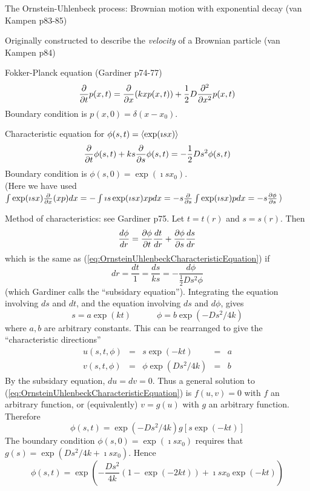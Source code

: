 \documentclass{beamer}
\begin{document}
\begin{frame}{}

The Ornstein-Uhlenbeck process: Brownian motion with exponential decay (van Kampen p83-85)
 \itemb
 \item Originally constructed to describe the {\em velocity} of a Brownian particle (van Kampen p84)
 \item Fokker-Planck equation (Gardiner p74-77)
\[
\frac{\partial}{\partial {t}} p(x,t) = \frac{\partial}{\partial {x}} (kxp(x,t)) + \frac{1}{2} D \frac{\partial^{2}}{\partial {x}^{2}} p(x,t)
\]
Boundary condition is $p(x,0) = \delta(x-x_0)$.
 \item Characteristic equation for $\phi(s,t) = \langle \exp(\imath sx) \rangle$
\begin{equation}
\label{eq:OrnsteinUhlenbeckCharacteristicEquation}
\frac{\partial}{\partial {t}} \phi(s,t) + ks\frac{\partial}{\partial {s}} \phi(s,t) = -\frac{1}{2} Ds^2 \phi(s,t)
\end{equation}
Boundary condition is $\phi(s,0) = \exp(\imath sx_0)$.
\\
(Here we have used $\int \exp(\imath sx) \frac{\partial}{\partial {x}} (xp) dx = -\int \imath s \exp(\imath sx) xp dx = -s \frac{\partial}{\partial {s}} \int \exp(\imath sx) pdx = -s \frac{\partial {\phi}}{\partial {s}}$)
  \itemb
  \item Method of characteristics: see Gardiner p75.
Let $t=t(r)$ and $s=s(r)$. Then
\[
\frac{d {\phi}}{d {r}} = \frac{\partial {\phi}}{\partial {t}} \frac{d {t}}{d {r}} + \frac{\partial {\phi}}{\partial {s}} \frac{d {s}}{d {r}}
\]
which is the same as (\ref{eq:OrnsteinUhlenbeckCharacteristicEquation}) if
\[
dr = \frac{dt}{1} = \frac{ds}{ks} = -\frac{d\phi}{\frac{1}{2} Ds^2 \phi}
\]
(which Gardiner calls the ``subsidary equation'').
Integrating the equation involving $ds$ and $dt$, and the equation involving $ds$ and $d\phi$, gives
\[
s = a \exp(kt)
\quad\quad\quad
\phi = b \exp(-Ds^2/4k)
\]
where $a,b$ are arbitrary constants.
This can be rearranged to give the ``characteristic directions''
\[
\begin{array}{rllll}
u(s,t,\phi) & = & s\exp(-kt) & = & a \\
v(s,t,\phi) & = & \phi\exp(Ds^2/4k) & = & b
\end{array}
\]
By the subsidary equation, $du=dv=0$.
Thus a general solution to (\ref{eq:OrnsteinUhlenbeckCharacteristicEquation})
is $f(u,v)=0$ with $f$ an arbitrary function,
or (equivalently) $v=g(u)$ with $g$ an arbitrary function.
Therefore
\[
\phi(s,t) = \exp(-Ds^2/4k) g\left[ s \exp(-kt) \right]
\]
The boundary condition $\phi(s,0)=\exp(\imath sx_0)$ requires that $g(s) = \exp(Ds^2/4k + \imath sx_0)$.
Hence
\[
\phi(s,t) = \exp \left( -\frac{Ds^2}{4k} (1 - \exp(-2kt))  + \imath sx_0 \exp(-kt) \right)
\]
\end{frame}
\end{document}
